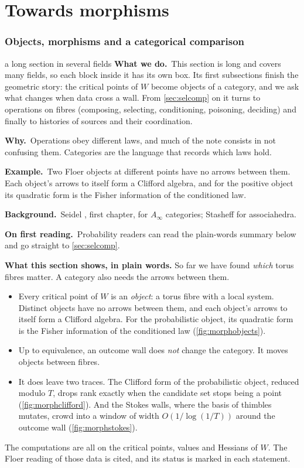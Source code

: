 \documentclass[11pt]{article}
\theoremstyle{definition}\newtheorem{definition}[theorem]{Definition}\newtheorem{remark}[theorem]{Remark}\newtheorem{example}[theorem]{Example}\newtheorem{problem}[theorem]{Open problem}\crefname{problem}{Problem}{Problems}
\newcommand{\rbwhat}{\textcolor{rbWhat}{\textbf{What we do.}}~}\newcommand{\rbwhy}{\par\smallskip\textcolor{rbWhy}{\textbf{Why.}}~}
\newcommand{\rbex}{\par\smallskip\textcolor{rbEx}{\textbf{Example.}}~}\newcommand{\rbbg}{\par\smallskip\textcolor{rbBg}{\textbf{Background.}}~}
\newcommand{\rbfirst}{\par\smallskip\textcolor{rbFirst}{\textbf{On first reading.}}~}
\begin{document}
\part{Towards morphisms}
\section{Objects, morphisms and a categorical comparison}\label{sec:morph}
\begin{readerbox}{a long section in several fields}
\rbwhat This section is long and covers many fields, so each block inside it has its own box. Its first subsections finish the geometric story: the critical points of $W$ become objects of a category, and we ask what changes when data cross a wall. From \cref{sec:selcomp} on it turns to operations on fibres (composing, selecting, conditioning, poisoning, deciding) and finally to histories of sources and their coordination.
\rbwhy Operations obey different laws, and much of the note consists in not confusing them. Categories are the language that records which laws hold.
\rbex Two Floer objects at different points have no arrows between them. Each object's arrows to itself form a Clifford algebra, and for the positive object its quadratic form is the Fisher information of the conditioned law.
\rbbg Seidel \cite{Seidel2008}, first chapter, for $A_\infty$ categories; Stasheff \cite{Stasheff1963} for associahedra.
\rbfirst Probability readers can read the plain-words summary below and go straight to \cref{sec:selcomp}.
\end{readerbox}
\begin{center}\colorbox{stAdapted!60}{\begin{minipage}{0.94\linewidth}\small
\textbf{What this section shows, in plain words.} So far we have found \emph{which} torus fibres matter. A category also needs the arrows between them.
\begin{itemize}[leftmargin=1.4em,itemsep=1pt]
\item Every critical point of $W$ is an \emph{object}: a torus fibre with a local system. Distinct objects have no arrows between them, and each object's arrows to itself
  form a Clifford algebra. For the probabilistic object, its quadratic form is the Fisher information of the conditioned law (\cref{fig:morphobjects}).
\item Up to equivalence, an outcome wall does \emph{not} change the category. It moves objects between fibres.
\item It does leave two traces. The Clifford form of the probabilistic object, reduced modulo $T$, drops rank exactly when the candidate set stops being a point (\cref{fig:morphclifford}).
  And the Stokes walls, where the basis of thimbles mutates, crowd into a window of width $O(1/\log(1/T))$ around the outcome wall (\cref{fig:morphstokes}).
\end{itemize}
The computations are all on the critical points, values and Hessians of $W$. The Floer reading of those data is cited, and its status is marked in each statement.
\end{minipage}}\end{center}
\end{document}
